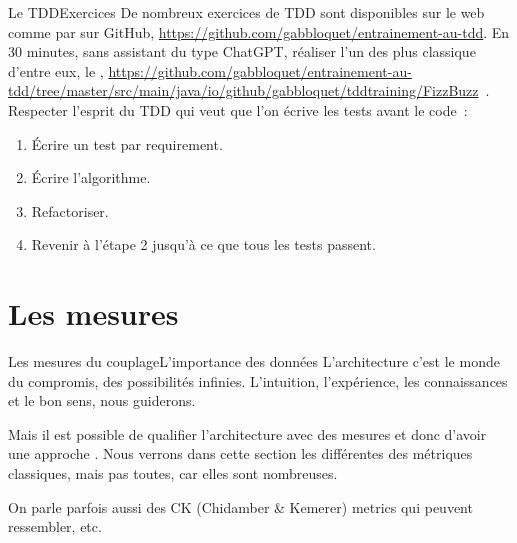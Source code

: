 \documentclass{beamer}
\begin{document}
    \begin{frame}{Le TDD}{Exercices \execcounterdispinc{}}
        De nombreux exercices de TDD sont disponibles sur le web comme par sur GitHub, \url{https://github.com/gabbloquet/entrainement-au-tdd}.
        \bigbreak
        En 30 minutes, sans assistant du type ChatGPT, réaliser l'un des plus classique d'entre eux, le , \url{https://github.com/gabbloquet/entrainement-au-tdd/tree/master/src/main/java/io/github/gabbloquet/tddtraining/FizzBuzz}~.
        Respecter l'esprit du TDD qui veut que l'on écrive les tests avant le code~:
        \begin{enumerate}
            \item Écrire un test par requirement.
            \item Écrire l'algorithme.
            \item Refactoriser.
            \item Revenir à l'étape 2 jusqu'à ce que tous les tests passent.
        \end{enumerate}

    \end{frame}


    \section{Les mesures}\label{sec:les-mesures}

    \begin{frame}{Les mesures du couplage}{L'importance des données}
        L'architecture c'est le monde du compromis, des possibilités infinies.
        \bigbreak
        L'intuition, l'expérience, les connaissances et le bon sens, nous guiderons.

        Mais il est possible de qualifier l'architecture avec des mesures et donc d'avoir une approche  .
        \bigbreak
        Nous verrons dans cette section les différentes des métriques classiques, mais pas toutes, car elles sont nombreuses.

        On parle parfois aussi des CK (Chidamber \& Kemerer) metrics qui peuvent ressembler, etc.
    \end{frame}
\end{document}
